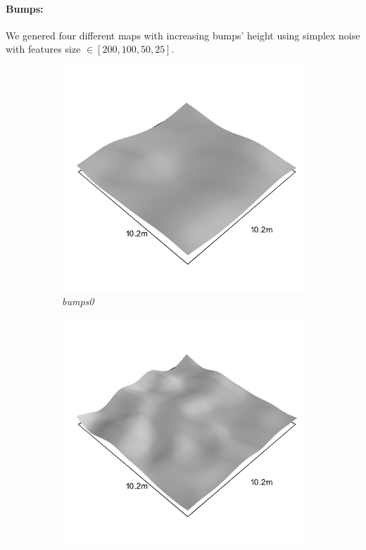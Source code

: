 \documentclass[../document.tex]{subfiles}
\begin{document}
\paragraph{Bumps:} 
We genered four different maps with increasing bumps' height using simplex noise with features size $\in[200,100,50,25 ]$. 
\begin{figure}[htbp]
    \centering
        \begin{subfigure}[b]{0.32\textwidth}
            \includegraphics[width=\textwidth]{../img/hm3d_borders/bumps0.png}
            \caption{\emph{bumps0}}
        \end{subfigure}
        \begin{subfigure}[b]{0.32\linewidth}
            \includegraphics[width=\textwidth]{../img/hm3d_borders/bumps1.png}

\end{subfigure}
\end{figure}
\end{document}
